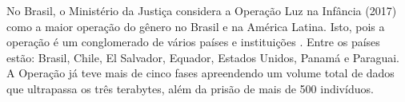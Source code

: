 

No Brasil, o Ministério da Justiça considera a Operação Luz na Infância (2017) como a maior operação do gênero no Brasil e na América Latina. Isto, pois a operação é um conglomerado de vários países e instituições \cite{souza2018sabemos}. Entre os países estão: Brasil, Chile, El Salvador, Equador, Estados Unidos, Panamá e Paraguai. A Operação já teve mais de cinco fases apreendendo um volume total de dados que ultrapassa os três terabytes, além da prisão de mais de 500 indivíduos. 


